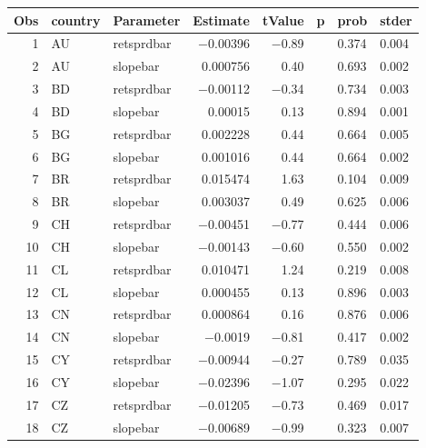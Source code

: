 

\begin{longtable}{|r|l|l|r|r|l|l|l|}\hline
   Obs &    country &    Parameter &    Estimate &    tValue &    p &    prob &    stder\\\hline
\endhead
   1 &    AU &    retsprdbar &    $-$0.00396 &    $-$0.89 &      &    0.374 &    0.004\\\hline
   2 &    AU &    slopebar &    0.000756 &    0.40 &      &    0.693 &    0.002\\\hline
   3 &    BD &    retsprdbar &    $-$0.00112 &    $-$0.34 &      &    0.734 &    0.003\\\hline
   4 &    BD &    slopebar &    0.00015 &    0.13 &      &    0.894 &    0.001\\\hline
   5 &    BG &    retsprdbar &    0.002228 &    0.44 &      &    0.664 &    0.005\\\hline
   6 &    BG &    slopebar &    0.001016 &    0.44 &      &    0.664 &    0.002\\\hline
   7 &    BR &    retsprdbar &    0.015474 &    1.63 &      &    0.104 &    0.009\\\hline
   8 &    BR &    slopebar &    0.003037 &    0.49 &      &    0.625 &    0.006\\\hline
   9 &    CH &    retsprdbar &    $-$0.00451 &    $-$0.77 &      &    0.444 &    0.006\\\hline
   10 &    CH &    slopebar &    $-$0.00143 &    $-$0.60 &      &    0.550 &    0.002\\\hline
   11 &    CL &    retsprdbar &    0.010471 &    1.24 &      &    0.219 &    0.008\\\hline
   12 &    CL &    slopebar &    0.000455 &    0.13 &      &    0.896 &    0.003\\\hline
   13 &    CN &    retsprdbar &    0.000864 &    0.16 &      &    0.876 &    0.006\\\hline
   14 &    CN &    slopebar &    $-$0.0019 &    $-$0.81 &      &    0.417 &    0.002\\\hline
   15 &    CY &    retsprdbar &    $-$0.00944 &    $-$0.27 &      &    0.789 &    0.035\\\hline
   16 &    CY &    slopebar &    $-$0.02396 &    $-$1.07 &      &    0.295 &    0.022\\\hline
   17 &    CZ &    retsprdbar &    $-$0.01205 &    $-$0.73 &      &    0.469 &    0.017\\\hline
   18 &    CZ &    slopebar &    $-$0.00689 &    $-$0.99 &      &    0.323 &    0.007\\\hline

\end{longtable}
